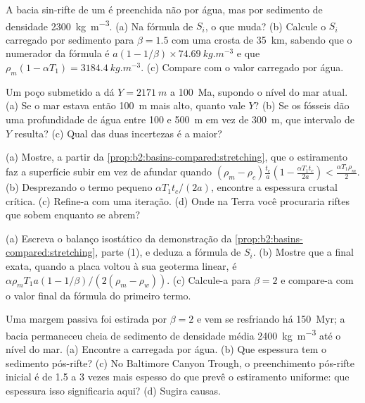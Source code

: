 \begin{exercise}[$\star\star$]\label{exo:b2:basins-compared:8}
A bacia sin-rifte de um  é preenchida não por água, mas por sedimento de densidade
\qty{2300}{kg.m^{-3}}. (a) Na fórmula de $S_i$, o que muda? (b) Calcule o $S_i$ carregado por sedimento
para $\beta = 1.5$ com uma crosta de \qty{35}{km}, sabendo que o numerador da fórmula é
$a(1 - 1/\beta)\times\qty{74.69}{kg.m^{-3}}$ e que $\rho_m(1 - \alpha T_1) =
\qty{3184.4}{kg.m^{-3}}$. (c) Compare com o valor carregado por água.
\end{exercise}

\begin{exercise}[$\star\star$]\label{exo:b2:basins-compared:9}
Um poço submetido a  dá $Y = \qty{2171}{m}$ a \qty{100}{Ma}, supondo o nível do mar atual. (a)
Se o mar estava então \qty{100}{m} mais alto, quanto vale $Y$? (b) Se os fósseis dão uma profundidade de água
entre 100 e \qty{500}{m} em vez de \qty{300}{m}, que intervalo de $Y$ resulta? (c) Qual das
duas incertezas é a maior?
\end{exercise}

\begin{exercise}[$\star\star\star$]\label{exo:b2:basins-compared:10}
(a) Mostre, a partir da \cref{prop:b2:basins-compared:stretching}, que o estiramento faz a superfície subir
em vez de afundar quando $(\rho_m - \rho_c)\frac{t_c}{a}\left(1 - \frac{\alpha T_1 t_c}{2a}\right) <
\frac{\alpha T_1\rho_m}{2}$. (b) Desprezando o termo pequeno $\alpha T_1 t_c/(2a)$, encontre a
espessura crustal crítica. (c) Refine-a com uma iteração. (d) Onde na Terra você procuraria
riftes que sobem enquanto se abrem?
\end{exercise}

\begin{exercise}[$\star\star\star$]\label{exo:b2:basins-compared:11}
(a) Escreva o balanço isostático da demonstração da \cref{prop:b2:basins-compared:stretching}, parte
(1), e deduza a fórmula de $S_i$. (b) Mostre que a  final exata, quando
a placa voltou à sua geoterma linear, é $\alpha\rho_m T_1 a(1 - 1/\beta)/(2(\rho_m -
\rho_w))$. (c) Calcule-a para $\beta = 2$ e compare-a com o valor final da
fórmula do primeiro termo.
\end{exercise}

\begin{exercise}[$\star\star\star$]\label{exo:b2:basins-compared:12}
Uma margem passiva foi estirada por $\beta = 2$ e vem se resfriando há \qty{150}{Myr}; a
bacia permaneceu cheia de sedimento de densidade média \qty{2400}{kg.m^{-3}} até o nível do mar.
(a) Encontre a  carregada por água. (b) Que espessura tem o sedimento pós-rifte?
(c) No Baltimore Canyon Trough, o preenchimento pós-rifte inicial é de 1.5 a 3 vezes mais espesso do que
prevê o estiramento uniforme: que espessura isso significaria aqui? (d) Sugira causas.
\end{exercise}

